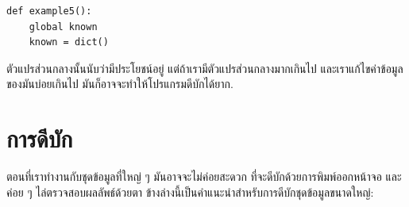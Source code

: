 \begin{verbatim}
def example5():
    global known
    known = dict()
\end{verbatim}
%
ตัวแปรส่วนกลางนั้นนับว่ามีประโยชน์อยู่
แต่ถ้าเรามีตัวแปรส่วนกลางมากเกินไป
และเราแก้ไขค่าข้อมูลของมันบ่อยเกินไป
มันก็อาจจะทำให้โปรแกรมดีบักได้ยาก.


\section{การดีบัก}

ตอนที่เราทำงานกับชุดข้อมูลที่ใหญ่ ๆ 
มันอาจจะไม่ค่อยสะดวก
ที่จะดีบักด้วยการพิมพ์ออกหน้าจอ และค่อย ๆ ไล่ตรวจสอบผลลัพธ์ด้วยตา
ข้างล่างนี้เป็นคำแนะนำสำหรับการดีบักชุดข้อมูลขนาดใหญ่:

